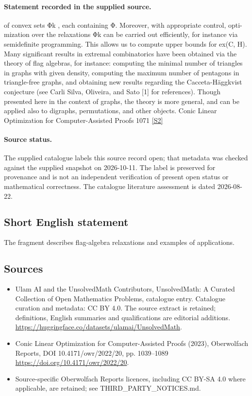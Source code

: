 \documentclass[11pt]{article}
\newcommand{\sref}[2]{\hyperlink{source:#1:#2}{[S#2]}}
\begin{document}
\paragraph{Statement recorded in the supplied source.}
of convex sets Φk , each containing Φ. Moreover, with appropriate control, opti- mization over the relaxations Φk can be carried out efficiently, for instance via semidefinite programming. This allows us to compute upper bounds for ex(C, H). Many significant results in extremal combinatorics have been obtained via the theory of flag algebras, for instance: computing the minimal number of triangles in graphs with given density, computing the maximum number of pentagons in triangle-free graphs, and obtaining new results regarding the Cacceta-Häggkvist conjecture (see Carli Silva, Oliveira, and Sato [1] for references). Though presented here in the context of graphs, the theory is more general, and can be applied also to digraphs, permutations, and other objects. Conic Linear Optimization for Computer-Assisted Proofs 1071 \sref{statement}{2}
\paragraph{Source status.}
The supplied catalogue labels this source record open; that metadata was checked against the supplied snapshot on 2026-10-11. The label is preserved for provenance and is not an independent verification of present open status or mathematical correctness. The catalogue literature assessment is dated 2026-08-22.
\subsection{Short English statement}
The fragment describes flag-algebra relaxations and examples of applications.
\subsection{Sources}
\begin{itemize}
\item[\hypertarget{source:statement:1}{S1}] Ulam AI and the UnsolvedMath Contributors, UnsolvedMath: A Curated Collection of Open Mathematics Problems, catalogue entry. Catalogue curation and metadata: CC BY 4.0. The source extract is retained; definitions, English summaries and qualifications are editorial additions.
\url{https://huggingface.co/datasets/ulamai/UnsolvedMath}.
\item[\hypertarget{source:statement:2}{S2}] Conic Linear Optimization for Computer-Assisted Proofs (2023), Oberwolfach Reports, DOI 10.4171/owr/2022/20, pp. 1039--1089
\url{https://doi.org/10.4171/owr/2022/20}.
\item Source-specific Oberwolfach Reports licences, including CC BY-SA 4.0 where applicable, are retained; see THIRD\_PARTY\_NOTICES.md.
\end{itemize}
\end{document}
